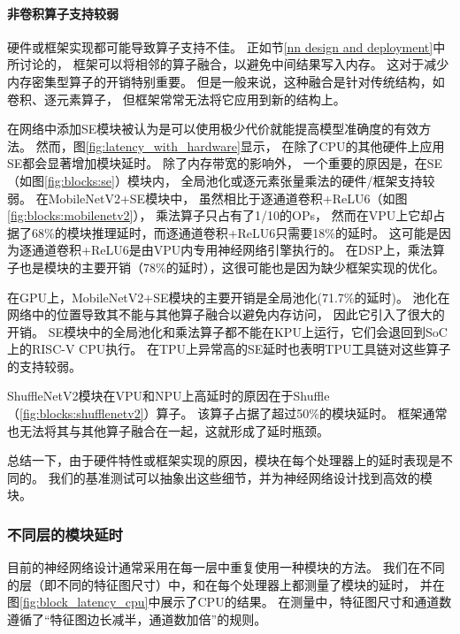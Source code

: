\paragraph{非卷积算子支持较弱}
硬件或框架实现都可能导致算子支持不佳。
正如节\ref{nn design and deployment}中所讨论的，
框架可以将相邻的算子融合，以避免中间结果写入内存。
这对于减少内存密集型算子的开销特别重要。
但是一般来说，这种融合是针对传统结构，如卷积、逐元素算子，
但框架常常无法将它应用到新的结构上。

在网络中添加SE模块被认为是可以使用极少代价就能提高模型准确度的有效方法。
然而，图\ref{fig:latency_with_hardware}显示，
在除了CPU的其他硬件上应用SE都会显著增加模块延时。
除了内存带宽的影响外，
一个重要的原因是，在SE（如图\ref{fig:blocks:se}）模块内，
全局池化或逐元素张量乘法的硬件/框架支持较弱。
在MobileNetV2+SE模块中，
虽然相比于逐通道卷积+ReLU6（如图\ref{fig:blocks:mobilenetv2}），
乘法算子只占有了1/10的OPs，
然而在VPU上它却占据了68\%的模块推理延时，而逐通道卷积+ReLU6只需要18\%的延时。
这可能是因为逐通道卷积+ReLU6是由VPU内专用神经网络引擎执行的。
在DSP上，乘法算子也是模块的主要开销（78\%的延时），这很可能也是因为缺少框架实现的优化。

在GPU上，MobileNetV2+SE模块的主要开销是全局池化(71.7\%的延时)。
池化在网络中的位置导致其不能与其他算子融合以避免内存访问，
因此它引入了很大的开销。
SE模块中的全局池化和乘法算子都不能在KPU上运行，它们会退回到SoC上的RISC-V CPU执行。
在TPU上异常高的SE延时也表明TPU工具链对这些算子的支持较弱。

ShuffleNetV2模块在VPU和NPU上高延时的原因在于Shuffle（\ref{fig:blocks:shufflenetv2}）算子。
该算子占据了超过50\%的模块延时。
框架通常也无法将其与其他算子融合在一起，这就形成了延时瓶颈。

总结一下，由于硬件特性或框架实现的原因，模块在每个处理器上的延时表现是不同的。
我们的基准测试可以抽象出这些细节，并为神经网络设计找到高效的模块。

\subsubsection{不同层的模块延时}
\label{analysis:op block:block with layer}


目前的神经网络设计通常采用在每一层中重复使用一种模块的方法。
我们在不同的层（即不同的特征图尺寸）中，和在每个处理器上都测量了模块的延时，
并在图\ref{fig:block_latency_cpu}中展示了CPU的结果。
在测量中，特征图尺寸和通道数遵循了``特征图边长减半，通道数加倍''的规则。

